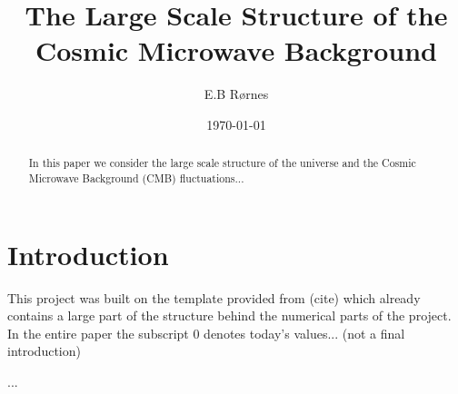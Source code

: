 \documentclass[%
reprint,
 amsmath,amssymb,
 aps,
]{revtex4-2}
\begin{document}
\title{The Large Scale Structure of the Cosmic Microwave Background}

\author{E.B Rørnes}

\date{\today}

\begin{abstract}
In this paper we consider the large scale structure of the universe and the Cosmic Microwave Background (CMB) fluctuations...
\end{abstract}

\maketitle


\section{Introduction}

This project was built on the template provided from (cite) which already contains a large part of the structure behind the numerical parts of the project. In the entire paper the subscript 0 denotes today's values... (not a final introduction)

















\begin{acknowledgements}
	...
\end{acknowledgements}




\end{document}
